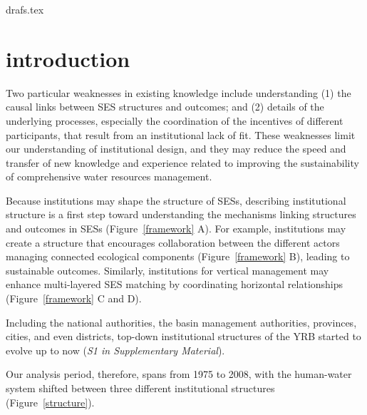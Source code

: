 drafs.tex

\section{introduction}
Two particular weaknesses in existing knowledge include understanding (1) the causal links between SES structures and outcomes; and (2) details of the underlying processes, especially the coordination of the incentives of different participants, that result from an institutional lack of fit. These weaknesses limit our understanding of institutional design, and they may reduce the speed and transfer of new knowledge and experience related to improving the sustainability of comprehensive water resources management.

Because institutions may shape the structure of SESs, describing institutional structure is a first step toward understanding the mechanisms linking structures and outcomes in SESs (Figure~\ref{framework} A).
For example, institutions may create a structure that encourages collaboration between the different actors managing connected ecological components (Figure~\ref{framework} B), leading to sustainable outcomes.
Similarly, institutions for vertical management may enhance multi-layered SES matching by coordinating horizontal relationships (Figure~\ref{framework} C and D).

Including the national authorities, the basin management authorities, provinces, cities, and even districts, top-down institutional structures of the YRB started to evolve up to now (\textit{S1 in Supplementary Material}).

Our analysis period, therefore, spans from 1975 to 2008, with the human-water system shifted between three different institutional structures (Figure~\ref{structure}).


